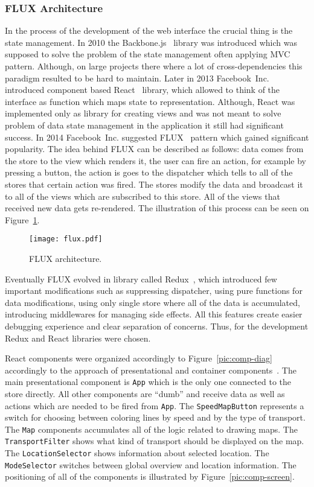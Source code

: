 \subsubsection{FLUX Architecture}
In the process of the development of the web interface the crucial thing is the state management.
In 2010 the Backbone.js~\cite{backbone} library was introduced which was supposed to solve the problem of the
state management often applying MVC~\cite{backbone:mvc} pattern. Although, on large projects there
where a lot of cross-dependencies this paradigm resulted to be hard to maintain. Later in 2013
Facebook~Inc. introduced component based React~\cite{react} library, which allowed to think
of the interface as function which maps state to representation. Although, React was implemented
only as library for creating views and was not meant to solve problem of data state management in
the application it still had significant success. In 2014 Facebook~Inc. suggested FLUX~\cite{flux} pattern
which gained significant popularity. The idea behind FLUX can be described as follows: data comes
from the store to the view which renders it, the user can fire an action, for example by pressing
a button, the action is goes to the dispatcher which tells to all of the stores that certain action
was fired. The stores modify the data and broadcast it to all of the views which are subscribed to
this store. All of the views that received new data gets re-rendered. The illustration of this
process can be seen on Figure~\ref{pic:flux}.

\begin{figure}[h]
  \centering
  \texttt{[image: flux.pdf]}
  \caption{FLUX architecture.}
  \label{pic:flux}
\end{figure}

Eventually FLUX evolved in library called Redux~\cite{redux}, which introduced few important
modifications such as suppressing dispatcher, using pure functions for data modifications, using
only single store where all of the data is accumulated, introducing middlewares for managing
side effects. All this features create easier debugging experience and clear separation
of concerns. Thus, for the development Redux and React libraries were chosen.

React components were organized accordingly to Figure~\ref{pic:comp-diag} accordingly to
the approach of presentational and container components~\cite{redux:ppc}. The main presentational
component is \texttt{App} which is the only one connected to the store directly. All other
components are ``dumb'' and receive data as well as actions which are
needed to be fired from \texttt{App}. The \texttt{SpeedMapButton} represents a switch for choosing
between coloring lines by speed and by the type of transport. The \texttt{Map} components
accumulates all of the logic related to drawing maps. The \texttt{TransportFilter} shows
what kind of transport should be displayed on the map. The \texttt{LocationSelector}
shows information about selected location. The \texttt{ModeSelector} switches between
global overview and location information. The positioning of all of the components is illustrated
by Figure~\ref{pic:comp-screen}.


